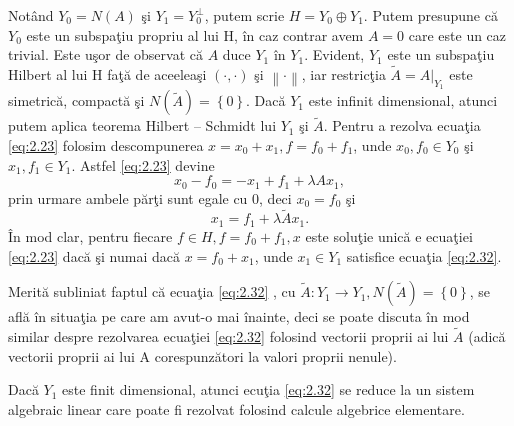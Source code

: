 \documentclass[a4paper,12pt,oneside]{report}
\begin{document}
\noindent Not\^{a}nd \(Y_{0} = N\left ( A \right )\) \c{s}i \(Y_{1} = Y_{0}^{\perp }\), putem scrie \(H = Y_{0}\oplus Y_{1}\). Putem presupune c\u{a} \(Y_{0}\) este un subspa\c{t}iu propriu al lui H, \^{i}n caz contrar avem \(A = 0\) care este un caz trivial. Este u\c{s}or de observat c\u{a} \(A\) duce \(Y_{1}\) \^{i}n \(Y_{1}\). Evident, \(Y_{1}\) este un subspa\c{t}iu Hilbert al lui H fa\c{t}\u{a} de aceelea\c{s}i \(\left ( \cdot ,\cdot  \right )\) \c{s}i \(\left \| \cdot  \right \|\), iar restric\c{t}ia \(\tilde{A} = A|_{Y_{1}}\) este simetric\u{a}, compact\u{a} \c{s}i \(N\left ( \tilde{A} \right ) = \left \{ 0 \right \}\). Dac\u{a} \(Y_{1}\)  este infinit dimensional, atunci putem aplica teorema Hilbert – Schmidt lui \(Y_{1}\) \c{s}i \(\tilde{A}\). Pentru a rezolva ecua\c{t}ia \ref{eq:2.23} folosim descompunerea \(x = x_{0}+x_{1}, f = f_{0} + f_{1}\), unde \(x_{0},f_{0} \in Y_{0}\) \c{s}i \(x_{1},f_{1} \in Y_{1}\). Astfel \ref{eq:2.23} devine
\begin{displaymath}
x_{0} - f_{0} = -x_{1} + f_{1} + \lambda Ax_{1},
\end{displaymath}
prin urmare ambele p\u{a}r\c{t}i sunt egale cu \(0\), deci \(x_{0} = f_{0}\) \c{s}i
\begin{displaymath}
x_{1} = f_{1} + \lambda \tilde{A}x_{1}. \label{eq:2.32} \tag{2.32}
\end{displaymath}
\^{I}n mod clar, pentru fiecare \(f\in H, f = f_{0} + f_{1}, x\) este solu\c{t}ie unic\u{a} e ecua\c{t}iei \ref{eq:2.23} dac\u{a} \c{s}i numai dac\u{a} \(x = f_{0} + x_{1}\), unde \(x_{1} \in Y_{1}\) satisfice ecua\c{t}ia \ref{eq:2.32}.

\noindent Merit\u{a} subliniat faptul c\u{a} ecua\c{t}ia \ref{eq:2.32} , cu \(\tilde{A} : Y_{1}\rightarrow Y_{1}, N\left ( \tilde{A} \right ) = \left \{ 0 \right \}\), se afl\u{a} \^{i}n situa\c{t}ia pe care am avut-o mai \^{i}nainte, deci se poate discuta \^{i}n mod similar despre rezolvarea ecua\c{t}iei \ref{eq:2.32} folosind vectorii proprii ai lui \(\tilde{A}\) (adic\u{a} vectorii proprii ai lui A corespunz\u{a}tori la valori proprii nenule).

Dac\u{a} \(Y_{1}\) este finit dimensional, atunci ecu\c{t}ia \ref{eq:2.32} se reduce la un sistem algebraic linear care poate fi rezolvat folosind calcule algebrice elementare.
\end{document}
